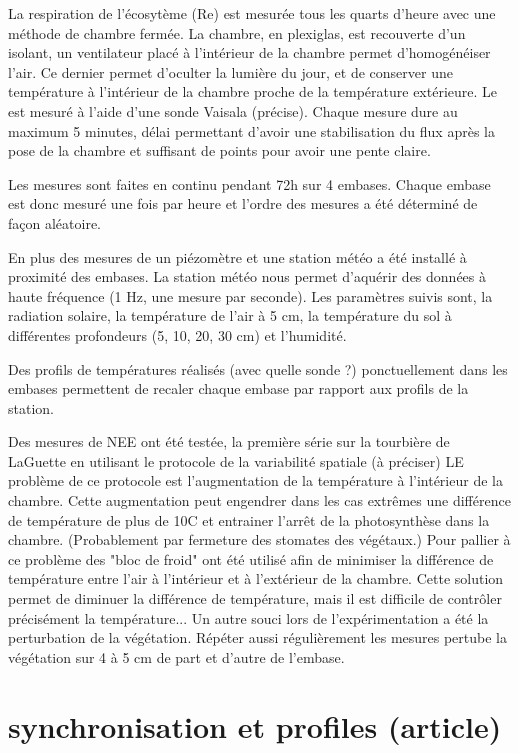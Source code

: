 La respiration de l'écosytème (Re) est mesurée tous les quarts d'heure avec une méthode de chambre fermée.
La chambre, en plexiglas, est recouverte d'un isolant, un ventilateur placé à l'intérieur de la chambre permet d'homogénéiser l'air.
Ce dernier permet d'oculter la lumière du jour, et de conserver une température à l'intérieur de la chambre proche de la température extérieure.
Le \COO est mesuré à l'aide d'une sonde Vaisala (\plop précise).
Chaque mesure dure au maximum 5 minutes, délai permettant d'avoir une stabilisation du flux après la pose de la chambre et suffisant de points pour avoir une pente claire.

Les mesures sont faites en continu pendant 72h sur 4 embases. 
Chaque embase est donc mesuré une fois par heure et l'ordre des mesures a été déterminé de façon aléatoire.

En plus des mesures de \COO un piézomètre et une station météo a été installé à proximité des embases.
La station météo nous permet d'aquérir des données à haute fréquence (1 Hz, une mesure par seconde).
Les paramètres suivis sont, la radiation solaire, la température de l'air à 5 cm, la température du sol à différentes profondeurs (5, 10, 20, 30 cm) et l'humidité.

Des profils de températures réalisés (avec quelle sonde ?) ponctuellement dans les embases permettent de recaler chaque embase par rapport aux profils de la station.

Des mesures de NEE ont été testée, la première série sur la tourbière de LaGuette en utilisant le protocole de la variabilité spatiale (à préciser)
LE problème de ce protocole est l'augmentation de la température à l'intérieur de la chambre.
Cette augmentation peut engendrer dans les cas extrêmes une différence de température de plus de 10\degres C et entrainer l'arrêt de la photosynthèse dans la chambre.
(Probablement par fermeture des stomates des végétaux.)
Pour pallier à ce problème des "bloc de froid" ont été utilisé afin de minimiser la différence de température entre l'air à l'intérieur et à l'extérieur de la chambre.
Cette solution permet de diminuer la différence de température, mais il est difficile de contrôler précisément la température...
Un autre souci lors de l'expérimentation a été la perturbation de la végétation.
Répéter aussi régulièrement les mesures pertube la végétation sur 4 à 5 cm de part et d'autre de l'embase.

\section{synchronisation et profiles (article)}